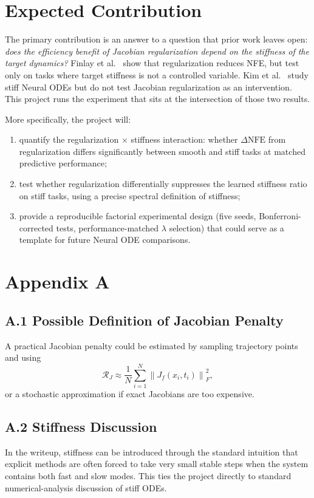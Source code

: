 \documentclass[11pt]{article}
\begin{document}
\section{Expected Contribution}

The primary contribution is an answer to a question that prior work leaves open: \emph{does the efficiency benefit of Jacobian regularization depend on the stiffness of the target dynamics?} Finlay et al.\ \citeyearpar{finlay2020trainnode} show that regularization reduces NFE, but test only on tasks where target stiffness is not a controlled variable. Kim et al.\ \citeyearpar{kim2021stiffnode} study stiff Neural ODEs but do not test Jacobian regularization as an intervention. This project runs the experiment that sits at the intersection of those two results.

More specifically, the project will:
\begin{enumerate}[leftmargin=2em]
    \item quantify the regularization $\times$ stiffness interaction: whether $\Delta\text{NFE}$ from regularization differs significantly between smooth and stiff tasks at matched predictive performance;
    \item test whether regularization differentially suppresses the learned stiffness ratio on stiff tasks, using a precise spectral definition of stiffness;
    \item provide a reproducible factorial experimental design (five seeds, Bonferroni-corrected tests, performance-matched $\lambda$ selection) that could serve as a template for future Neural ODE comparisons.
\end{enumerate}

\section*{Appendix A}

\subsection*{A.1 Possible Definition of Jacobian Penalty}
A practical Jacobian penalty could be estimated by sampling trajectory points and using
\begin{equation}
\mathcal{R}_J \approx \frac{1}{N} \sum_{i=1}^{N} \left\| J_f(x_i, t_i) \right\|_F^2,
\end{equation}
or a stochastic approximation if exact Jacobians are too expensive.

\subsection*{A.2 Stiffness Discussion}
In the writeup, stiffness can be introduced through the standard intuition that explicit methods are often forced to take very small stable steps when the system contains both fast and slow modes. This ties the project directly to standard numerical-analysis discussion of stiff ODEs.
\end{document}
